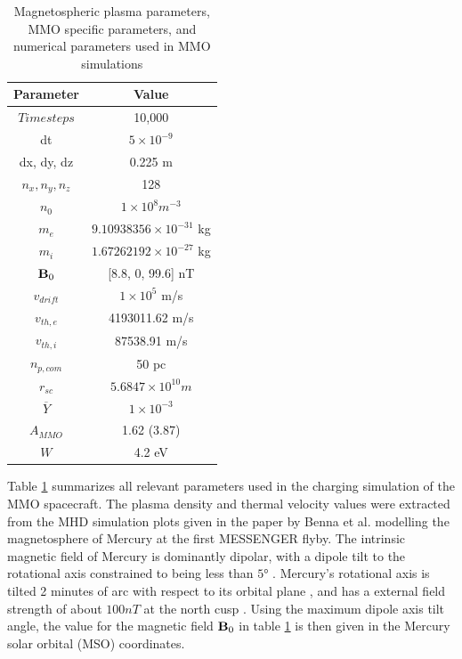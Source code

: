 \begin{table}[H]
    \centering
    \begin{tabular}{c|c}
        \toprule
        \toprule
        Parameter & Value \\
        \midrule
        $Timesteps$ & 10,000 \\
        dt & $5 \times 10^{-9}$ \\
        dx, dy, dz & 0.225 m \\
        $n_x, n_y, n_z$ & 128 \\
        $n_0$ & $1 \times 10^8 m^{-3}$ \\
        $m_e$ & $9.10938356 \times 10^{-31}$ kg\\
        $m_i$ & $1.67262192 \times 10^{-27}$ kg\\
        $\vb{B}_0$ & [8.8, 0, 99.6] nT\\
        $v_{drift}$ & $1 \times 10^5$ m/s\\
        $v_{th,e}$ & 4193011.62 m/s\\
        $v_{th,i}$ & 87538.91 m/s\\
        $n_{p,com}$ & 50 pc\\
        $r_{sc}$ & $5.6847 \times 10^{10} m$\\
        $\overline{Y}$ & $ 1 \times 10^{-3}$ \\
        $A_{MMO}$ & 1.62 (3.87) \\
        $W$ & 4.2 eV \\
        \bottomrule
        \bottomrule
    \end{tabular}
    \caption{Magnetospheric plasma parameters, MMO specific parameters, and numerical parameters used in MMO simulations}
    \label{tab:PlasmaParamMMO}
\end{table}

Table \ref{tab:PlasmaParamMMO} summarizes all relevant parameters used in the charging simulation of the MMO spacecraft. The plasma density and thermal velocity values were extracted from the MHD simulation plots given in the paper by Benna et al. modelling the magnetosphere of Mercury at the first MESSENGER flyby. The intrinsic magnetic field of Mercury is dominantly dipolar, with a dipole tilt to the rotational axis constrained to being less than $\ang{5}$ . Mercury's rotational axis is tilted 2 minutes of arc with respect to its orbital plane \parencite{Rothery2015}, and has a external field strength of about $100 nT$ at the north cusp . Using the maximum dipole axis tilt angle, the value for the magnetic field $\vb{B}_0$ in table \ref{tab:PlasmaParamMMO} is then given in the Mercury solar orbital (MSO) coordinates. 

